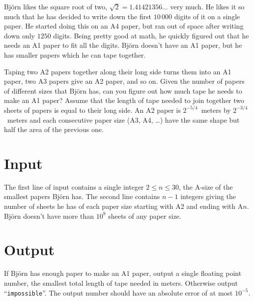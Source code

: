 

Björn likes the square root of two, $\sqrt{2} = 1.41421356\dots$ very much. He likes it so much that
he has decided to write down the first $10\,000$ digits of it on a single paper. He started doing
this on an A4 paper, but ran out of space after writing down only $1250$ digits. Being pretty good at
math, he quickly figured out that he needs an A1 paper to fit all the digits. Björn doesn't have an A1
paper, but he has smaller papers which he can tape together.

Taping two A2 papers together along their long side turns them into an A1 paper, two A3 papers give
an A2 paper, and so on. Given the number of papers of different sizes that Björn has, can you figure
out how much tape he needs to make an A1 paper? Assume that the length of tape needed to join
together two sheets of papers is equal to their long side. An A2 paper is $2^{-5/4}$~meters by
$2^{-3/4}$~meters and each consecutive paper size (A3, A4, \dots) have the same shape but half the
area of the previous one.

\section*{Input}
The first line of input contains a single integer $2\leq n \leq 30$, the A-size of the smallest
papers Björn has. The second line contains $n-1$ integers giving the number of sheets he has of each
paper size starting with A2 and ending with A$n$. Björn doesn't have more than $10^9$ sheets of any
paper size.

\section*{Output}
If Björn has enough paper to make an A1 paper, output a single floating point number, the smallest
total length of tape needed in meters. Otherwise output ``\texttt{impossible}''. The output number should have an absolute error of at most $10^{-5}$.
